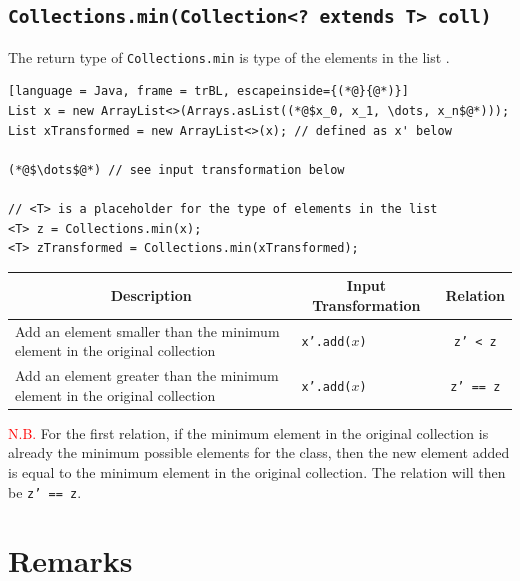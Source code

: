 \documentclass[12pt, a4paper]{article}
\begin{document}
\subsection{\texttt{Collections.min(Collection<? extends T> coll)}}
The return type of \texttt{Collections.min} is type of the elements in the list
\cite{collection_min}.

\begin{lstlisting}[language = Java, frame = trBL, escapeinside={(*@}{@*)}]
List x = new ArrayList<>(Arrays.asList((*@$x_0, x_1, \dots, x_n$@*)));
List xTransformed = new ArrayList<>(x); // defined as x' below

(*@$\dots$@*) // see input transformation below

// <T> is a placeholder for the type of elements in the list
<T> z = Collections.min(x);
<T> zTransformed = Collections.min(xTransformed);
\end{lstlisting}

\begin{table}[H]
  \centering
  \begin{tabular}{p{8cm}|l|c}
  \hline
  \multicolumn{1}{c|}{\textbf{Description}} & \multicolumn{1}{c|}{\textbf{Input Transformation}} &
  \textbf{Relation} \\ \hline
  Add an element smaller than the minimum element in the original collection & \texttt{x'.add($x$)}
  & \texttt{z' < z} \\ \hline
  Add an element greater than the minimum element in the original collection & \texttt{x'.add($x$)} &
  \texttt{z' == z} \\ \hline
  \hline
  \end{tabular}
\end{table}

\textcolor{red}{N.B.} For the first relation, if the minimum element in the original collection is
already the minimum possible elements for the class, then the new element added is equal to the
minimum element in the original collection. The relation will then be \texttt{z' == z}.

\section{Remarks}


\printbibliography
\end{document}
